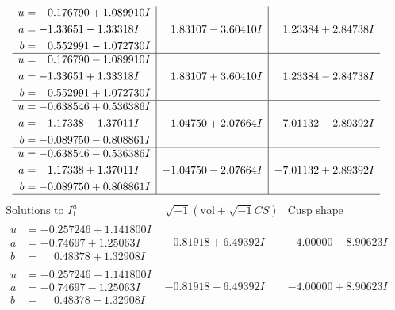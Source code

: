 \documentclass[1p]{elsarticle_modified}
\theoremstyle{definition}
\newcommand{\I}{\sqrt{-1}}
\begin{document}
$$\begin{array}{c|c|c}
\begin{aligned}
u &= \phantom{-}0.176790 + 1.089910 I \\
a &= -1.33651 - 1.33318 I \\
b &= \phantom{-}0.552991 - 1.072730 I\end{aligned}
 & \phantom{-}1.83107 - 3.60410 I & \phantom{-}1.23384 + 2.84738 I \\ \hline\begin{aligned}
u &= \phantom{-}0.176790 - 1.089910 I \\
a &= -1.33651 + 1.33318 I \\
b &= \phantom{-}0.552991 + 1.072730 I\end{aligned}
 & \phantom{-}1.83107 + 3.60410 I & \phantom{-}1.23384 - 2.84738 I \\ \hline\begin{aligned}
u &= -0.638546 + 0.536386 I \\
a &= \phantom{-}1.17338 - 1.37011 I \\
b &= -0.089750 - 0.808861 I\end{aligned}
 & -1.04750 + 2.07664 I & -7.01132 - 2.89392 I \\ \hline\begin{aligned}
u &= -0.638546 - 0.536386 I \\
a &= \phantom{-}1.17338 + 1.37011 I \\
b &= -0.089750 + 0.808861 I\end{aligned}
 & -1.04750 - 2.07664 I & -7.01132 + 2.89392 I\\
 \hline 
 \end{array}$$\newpage$$\begin{array}{c|c|c}  
\text{Solutions to }I^u_{1}& \I (\text{vol} + \sqrt{-1}CS) & \text{Cusp shape}\\
 \hline 
\begin{aligned}
u &= -0.257246 + 1.141800 I \\
a &= -0.74697 + 1.25063 I \\
b &= \phantom{-}0.48378 + 1.32908 I\end{aligned}
 & -0.81918 + 6.49392 I & -4.00000 - 8.90623 I \\ \hline\begin{aligned}
u &= -0.257246 - 1.141800 I \\
a &= -0.74697 - 1.25063 I \\
b &= \phantom{-}0.48378 - 1.32908 I\end{aligned}
 & -0.81918 - 6.49392 I & -4.00000 + 8.90623 I \\ \hline\begin{aligned}

\end{aligned}
\end{array}$$
\end{document}
